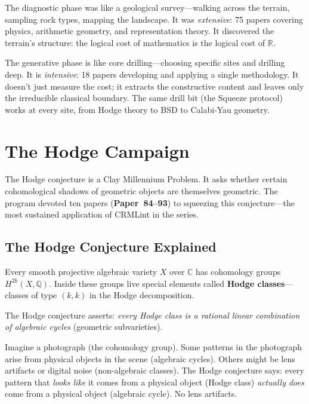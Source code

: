 \documentclass[11pt,twoside,openany]{report}
\theoremstyle{remark}
\newcommand{\paperref}[1]{\textbf{Paper~#1}}
\begin{document}
\begin{analogybox}
The diagnostic phase was like a geological survey---walking across the terrain, sampling rock types, mapping the landscape. It was \emph{extensive}: 75 papers covering physics, arithmetic geometry, and representation theory. It discovered the terrain's structure: the logical cost of mathematics is the logical cost of $\mathbb{R}$.

The generative phase is like core drilling---choosing specific sites and drilling deep. It is \emph{intensive}: 18 papers developing and applying a single methodology. It doesn't just measure the cost; it extracts the constructive content and leaves only the irreducible classical boundary. The same drill bit (the Squeeze protocol) works at every site, from Hodge theory to BSD to Calabi-Yau geometry.
\end{analogybox}


\chapter{The Hodge Campaign}

The Hodge conjecture is a Clay Millennium Problem. It asks whether certain cohomological shadows of geometric objects are themselves geometric. The program devoted ten papers (\paperref{84--93}) to squeezing this conjecture---the most sustained application of CRMLint in the series.


\section{The Hodge Conjecture Explained}

Every smooth projective algebraic variety $X$ over $\mathbb{C}$ has cohomology groups $H^{2k}(X, \mathbb{Q})$. Inside these groups live special elements called \textbf{Hodge classes}---classes of type $(k,k)$ in the Hodge decomposition.

The Hodge conjecture asserts: \emph{every Hodge class is a rational linear combination of algebraic cycles} (geometric subvarieties).

\begin{analogybox}
Imagine a photograph (the cohomology group). Some patterns in the photograph arise from physical objects in the scene (algebraic cycles). Others might be lens artifacts or digital noise (non-algebraic classes). The Hodge conjecture says: every pattern that \emph{looks like} it comes from a physical object (Hodge class) \emph{actually does} come from a physical object (algebraic cycle). No lens artifacts.
\end{analogybox}
\end{document}
